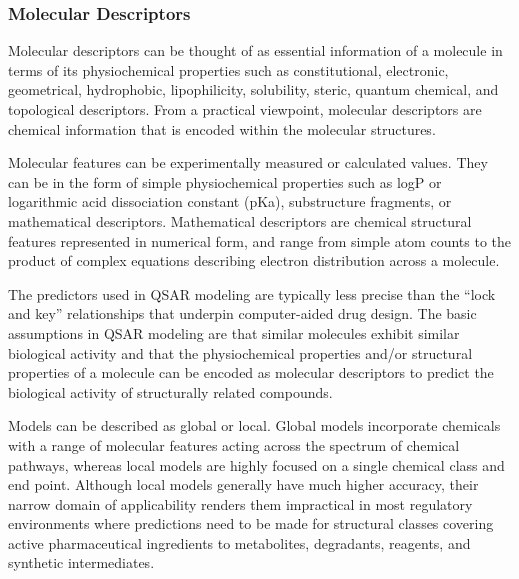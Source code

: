\subsubsection{Molecular Descriptors}
Molecular descriptors can be thought of as essential information of a molecule in terms of its physiochemical properties such as constitutional, electronic, geometrical, hydrophobic, lipophilicity, solubility, steric, quantum chemical, and topological descriptors. From a practical viewpoint, molecular descriptors are chemical information that is encoded within the molecular structures. \cite{Nantasenamat2009}


Molecular features can be experimentally measured or calculated values. They can be in the form of simple physiochemical properties such as logP or logarithmic acid dissociation constant (pKa), substructure fragments, or mathematical descriptors. Mathematical descriptors are chemical structural features represented in numerical form, and range from simple atom counts to the product of complex equations describing electron distribution across a molecule.\cite{Kruhlak2012}

The predictors used in QSAR modeling are typically less precise than the “lock and key” relationships that underpin computer-aided drug design. The basic assumptions in QSAR modeling are that similar molecules exhibit similar biological activity and that the physiochemical properties and/or structural properties of a molecule can be encoded as molecular descriptors to predict the biological activity of structurally related compounds.

Models can be described as global or local. Global models incorporate chemicals with a range of molecular features acting across the spectrum of chemical pathways, whereas local models are highly focused on a single chemical class and end point. Although local models generally have much higher accuracy, their narrow domain of applicability renders them impractical in most regulatory environments where predictions need to be made for structural classes covering active pharmaceutical ingredients to metabolites, degradants, reagents, and synthetic intermediates. \cite{Kruhlak2012}


